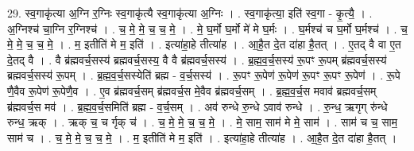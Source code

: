 \documentclass[17pt]{extarticle}
\begin{document}
29. स्व॒गाकृ॑त्या अ॒ग्नि र॒ग्निः स्व॒गाकृ॑त्यै स्व॒गाकृ॑त्या अ॒ग्निः । . स्व॒गाकृ॑त्या॒ इति॑ स्व॒गा - कृ॒त्यै॒ । . अ॒ग्निश्च॑ चा॒ग्नि र॒ग्निश्च॑ । . च॒ मे॒ मे॒ च॒ च॒ मे॒ । . मे॒ घ॒र्मो घ॒र्मो मे॑ मे घ॒र्मः । . घ॒र्मश्च॑ च घ॒र्मो घ॒र्मश्च॑ । . च॒ मे॒ मे॒ च॒ च॒ मे॒ । . म॒ इतीति॑ मे म॒ इति॑ । . इत्या॑हा॒हे तीत्या॑ह । . आ॒है॒त दे॒त दा॑हा है॒तत् । . ए॒तद् वै वा ए॒त दे॒तद् वै । . वै ब्र॑ह्मवर्च॒सस्य॑ ब्रह्मवर्च॒सस्य॒ वै वै ब्र॑ह्मवर्च॒सस्य॑ । . ब्र॒ह्म॒व॒र्च॒सस्य॑ रू॒पꣳ रू॒पम् ब्र॑ह्मवर्च॒सस्य॑ ब्रह्मवर्च॒सस्य॑ रू॒पम् । . ब्र॒ह्म॒व॒र्च॒सस्येति॑ ब्रह्म - व॒र्च॒सस्य॑ । . रू॒पꣳ रू॒पेण॑ रू॒पेण॑ रू॒पꣳ रू॒पꣳ रू॒पेण॑ । . रू॒पे णै॒वैव रू॒पेण॑ रू॒पेणै॒व । . ए॒व ब्र॑ह्मवर्च॒सम् ब्र॑ह्मवर्च॒स मे॒वैव ब्र॑ह्मवर्च॒सम् । . ब्र॒ह्म॒व॒र्च॒स मवाव॑ ब्रह्मवर्च॒सम् ब्र॑ह्मवर्च॒स मव॑ । . ब्र॒ह्म॒व॒र्च॒समिति॑ ब्रह्म - व॒र्च॒सम् । . अव॑ रुन्धे रु॒न्धे ऽवाव॑ रुन्धे । . रु॒न्ध॒ ऋगृग् रु॑न्धे रुन्ध॒ ऋक् । . ऋक् च॒ च र्गृक् च॑ । . च॒ मे॒ मे॒ च॒ च॒ मे॒ । . मे॒ साम॒ साम॑ मे मे॒ साम॑ । . साम॑ च च॒ साम॒ साम॑ च । . च॒ मे॒ मे॒ च॒ च॒ मे॒ । . म॒ इतीति॑ मे म॒ इति॑ । . इत्या॑हा॒हे तीत्या॑ह । . आ॒है॒त दे॒त दा॑हा है॒तत् । \newline
\end{document}
